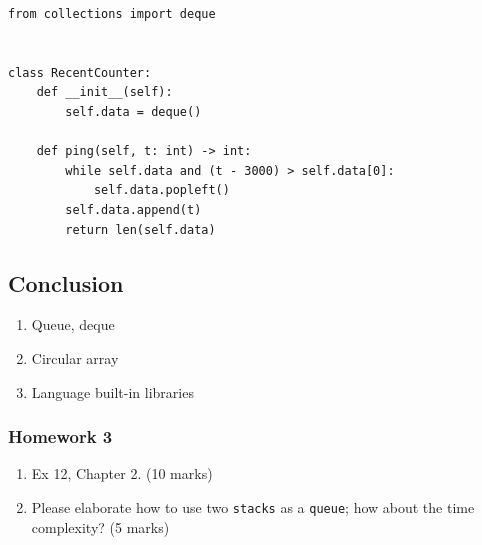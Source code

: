 \documentclass[aspectratio=169, 14pt]{beamer}
\begin{document}
\begin{frame}[fragile]

    \begin{verbatim}
from collections import deque


class RecentCounter:
    def __init__(self):
        self.data = deque()

    def ping(self, t: int) -> int:
        while self.data and (t - 3000) > self.data[0]:
            self.data.popleft()
        self.data.append(t)
        return len(self.data)
        \end{verbatim}

\end{frame}

\begin{frame}
\section{\textcolor{darkmidnightblue}{Conclusion}}
    \begin{enumerate}
        \item Queue, deque
        \item Circular array
        \item Language built-in libraries
    \end{enumerate}
\end{frame}
\begin{frame}
    \frametitle{Homework 3}
\begin{enumerate}
    \item Ex 12, Chapter 2. (10 marks)
    \item Please elaborate how to use two \texttt{stacks} as a \texttt{queue}; how about the time complexity?  (5 marks)
\end{enumerate}
\end{frame}
\end{document}
